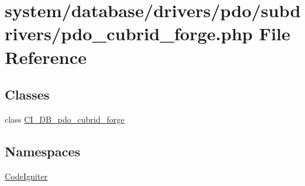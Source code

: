 \hypertarget{pdo__cubrid__forge_8php}{}\section{system/database/drivers/pdo/subdrivers/pdo\+\_\+cubrid\+\_\+forge.php File Reference}
\label{pdo__cubrid__forge_8php}
\subsection*{Classes}
\begin{DoxyCompactItemize}
\item 
class \mbox{\hyperlink{class_c_i___d_b__pdo__cubrid__forge}{C\+I\+\_\+\+D\+B\+\_\+pdo\+\_\+cubrid\+\_\+forge}}
\end{DoxyCompactItemize}
\subsection*{Namespaces}
\begin{DoxyCompactItemize}
\item 
 \mbox{\hyperlink{namespace_code_igniter}{Code\+Igniter}}
\end{DoxyCompactItemize}
